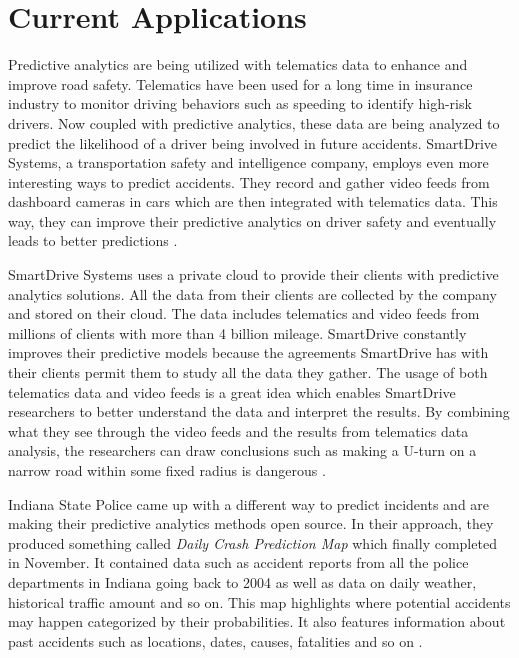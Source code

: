\section{Current Applications}

Predictive analytics are being utilized with telematics data to enhance and improve road safety. Telematics have been used for a long time in insurance industry to monitor driving behaviors such as speeding to identify high-risk drivers. Now coupled with predictive analytics, these data are being analyzed to predict the likelihood of a driver being involved in future accidents. SmartDrive Systems, a transportation safety and intelligence company, employs even more interesting ways to predict accidents. They record and gather video feeds from dashboard cameras in cars which are then integrated with telematics data. This way, they can improve their predictive analytics on driver safety and eventually leads to better predictions \cite{Banker2016accident}.

SmartDrive Systems uses a private cloud to provide their clients with predictive analytics solutions. All the data from their clients are collected by the company and stored on their cloud. The data includes telematics and video feeds from millions of clients with more than 4 billion mileage. SmartDrive constantly improves their predictive models because the agreements SmartDrive has with their clients permit them to study all the data they gather. The usage of both telematics data and video feeds is a great idea which enables SmartDrive researchers to better understand the data and interpret the results. By combining what they see through the video feeds and the results from telematics data analysis, the researchers can draw conclusions such as making a U-turn on a narrow road within some fixed radius is dangerous \cite{Banker2016accident}.

Indiana State Police came up with a different way to predict incidents and are making their predictive analytics methods open source. In their approach, they produced something called {\em Daily Crash Prediction Map} which finally completed in November. It contained data such as accident reports from all the police departments in Indiana going back to 2004 as well as data on daily weather, historical traffic amount and so on. This map highlights where potential accidents may happen categorized by their probabilities. It also features information about past accidents such as locations, dates, causes, fatalities and so on \cite{Bergal2017sites}.

